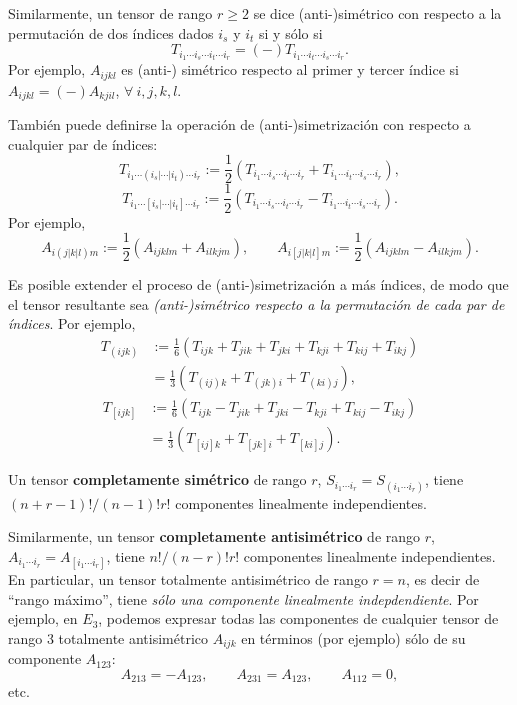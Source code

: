 Similarmente, un tensor de rango $r\ge 2$ se dice (anti-)simétrico con respecto a la permutación de dos índices dados $i_s$ y $i_t$ si y sólo si
\begin{equation}
T_{i_1\cdots i_s\cdots i_t\cdots i_r}=(-)T_{i_1\cdots i_t\cdots i_s\cdots i_r}.
\end{equation}
Por ejemplo, $A_{ijkl}$ es (anti-) simétrico respecto al primer y tercer índice si $A_{ijkl}=(-)A_{kjil}$, $\forall\ i,j,k,l$.

También puede definirse la operación de (anti-)simetrización con respecto a cualquier par de índices:
\begin{equation}
T_{i_1\cdots (i_s|\cdots |i_t)\cdots i_r}:=\frac{1}{2}\left(T_{i_1\cdots i_s\cdots i_t\cdots i_r}+T_{i_1\cdots i_t\cdots i_s\cdots i_r}\right),
\end{equation}
\begin{equation}
T_{i_1\cdots [i_s|\cdots |i_t]\cdots i_r}:=\frac{1}{2}\left(T_{i_1\cdots i_s\cdots i_t\cdots i_r}-T_{i_1\cdots i_t\cdots i_s\cdots i_r}\right).
\end{equation}
Por ejemplo, 
\begin{equation}
A_{i(j|k|l)m}:=\frac{1}{2}\left(A_{ijklm}+A_{ilkjm}\right), \qquad A_{i[j|k|l]m}:=\frac{1}{2}\left(A_{ijklm}-A_{ilkjm}\right).
\end{equation}

Es posible extender el proceso de (anti-)simetrización a más índices, de modo que el tensor resultante sea \textit{(anti-)simétrico respecto a la permutación de cada par de índices}. Por ejemplo,
\begin{align}
T_{(ijk)} &:= \frac{1}{6}\left(T_{ijk}+T_{jik}+T_{jki}+T_{kji}+T_{kij}+T_{ikj}\right) \\
&= \frac{1}{3}\left(T_{(ij)k}+T_{(jk)i}+T_{(ki)j}\right),
\end{align}
\begin{align}
T_{[ijk]} &:= \frac{1}{6}\left(T_{ijk}-T_{jik}+T_{jki}-T_{kji}+T_{kij}-T_{ikj}\right) \\
&= \frac{1}{3}\left(T_{[ij]k}+T_{[jk]i}+T_{[ki]j}\right).
\end{align}

Un tensor \textbf{completamente simétrico} de rango $r$, $S_{i_1\cdots i_r}=S_{(i_1\cdots i_r)}$, tiene $(n+r-1)!/(n-1)!r!$ componentes linealmente independientes.

Similarmente, un tensor \textbf{completamente antisimétrico} de rango $r$, $A_{i_1\cdots i_r}=A_{[i_1\cdots i_r]}$, tiene $n!/(n-r)!r!$ componentes linealmente independientes. En particular, un tensor totalmente antisimétrico de rango $r=n$, es decir de ``rango máximo'', tiene \textit{sólo una componente linealmente indepdendiente}. Por ejemplo, en $E_3$, podemos expresar todas las componentes de cualquier tensor de rango 3 totalmente antisimétrico $A_{ijk}$ en términos (por ejemplo) sólo de su componente $A_{123}$:
\begin{equation}
A_{213}=-A_{123}, \qquad A_{231}=A_{123}, \qquad A_{112}=0, 
\end{equation}
etc.

